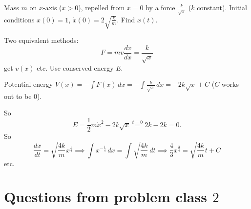 \documentclass[10pt, a4paper]{article}
\begin{document}
\begin{problem}[$2020$ exam]
    Mass $m$ on $x$-axis
    ($x > 0$),
    repelled from $x = 0$ by a force $\frac{k}{\sqrt{x}}$
    ($k$ constant).
    Initial conditions $x(0) = 1$,
    $\dot{x}(0) = 2\sqrt{\frac{k}{m}}$.
    Find $x(t)$.

    \begin{solution}
        Two equivalent methods:
        \[
        F = mv\frac{dv}{dx} = \frac{k}{\sqrt{x}}
        \]
        get $v(x)$ etc.
        Use conserved energy $E$.

        Potential energy $V(x) = -\int F(x)\,dx = -\int\frac{k}{\sqrt{x}}\,dx = -2k\sqrt{x}+ C$
        ($C$ works out to be $0$).

        So
        \[
        E = \frac{1}{2}m\dot{x} ^ 2 - 2k\sqrt{x} \overset{t = 0}{=} 2k - 2k = 0.
        \]
        So
        \[
        \frac{dx}{dt} = \sqrt{\frac{4k}{m}}x ^ {\frac{1}{4}} \implies \int x ^ {-\frac{1}{4}}\,dx = \int\sqrt{\frac{4k}{m}}\,dt \implies \frac{4}{3}x ^ {\frac{3}{4}} = \sqrt{\frac{4k}{m}}t + C
        \]
        etc.
    \end{solution}
\end{problem}

\newpage

\section{Questions from problem class \texorpdfstring{$2$}{}}
\end{document}
